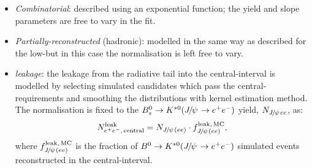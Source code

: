 \begin{itemize}

\item \textit{Combinatorial}: described using an exponential function;
the yield and slope parameters are free to vary in the fit.

\item \textit{Partially-reconstructed} (hadronic): modelled in the same way as described for the low-\qsq but in this case
the normalisation is left free to vary.

%
%

\item \textit{\BdToKstJPs leakage}: the leakage from the \jpsi radiative tail into the central-\qsq interval is modelled by selecting 
simulated \BdToKstJPsee candidates which pass the central-\qsq requirements and smoothing the distributions
with kernel estimation method. The normalisation is fixed to the $\Bs\to\Kstarz(\jpsi\to\ee)$ yield, 
$N_{\jpsi ee}$, as:
%
$$N_{\ee, \, {\rm central}}^{\rm leak} = N_{\jpsi(ee)} \cdot f_{\jpsi(ee)}^{\rm leak, \,MC},$$
%
where $f_{\jpsi(ee)}^{\rm leak, \,MC}$ is the fraction of $\Bd\to\Kstarz(\jpsi\to\ee)$ simulated events reconstructed
in the central-\qsq interval.

\end{itemize}

